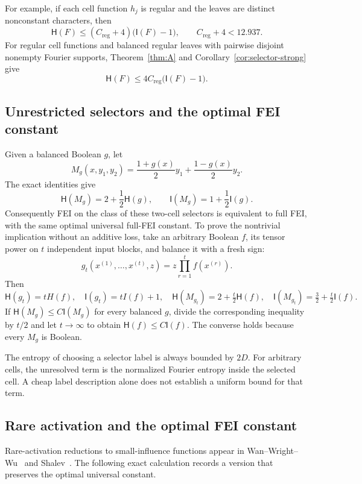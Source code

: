 \documentclass[11pt]{amsart}
\theoremstyle{definition}
\theoremstyle{remark}
\newcommand{\HH}{\mathsf H}
\newcommand{\I}{\mathsf I}
\newcommand{\Creg}{C_{\mathrm{reg}}}
\begin{document}
For example, if each cell function $h_j$ is regular and the leaves are
distinct nonconstant characters, then
\[
 \HH(F)\le(\Creg+4)\bigl(\I(F)-1\bigr),
 \qquad \Creg+4<12.937.
\]
For regular cell functions and balanced regular leaves with pairwise
disjoint nonempty Fourier supports, Theorem~\ref{thm:A} and
Corollary~\ref{cor:selector-strong} give
\[
 \HH(F)\le4\Creg\bigl(\I(F)-1\bigr).
\]

\subsection{Unrestricted selectors and the optimal FEI constant}

Given a balanced Boolean $g$, let
\[
 M_g(x,y_1,y_2)=\frac{1+g(x)}2y_1+\frac{1-g(x)}2y_2.
\]
The exact identities give
\[
 \HH(M_g)=2+\frac12\HH(g),\qquad \I(M_g)=1+\frac12\I(g).
\]
Consequently FEI on the class of these two-cell selectors is equivalent
to full FEI, with the same optimal universal full-FEI constant.
To prove the nontrivial implication without an additive loss, take an
arbitrary Boolean $f$, its tensor power on $t$ independent input blocks,
and balance it with a fresh sign:
\[
 g_t(x^{(1)},\ldots,x^{(t)},z)
   =z\prod_{r=1}^t f(x^{(r)}).
\]
Then
\[
 \HH(g_t)=tH(f),\quad \I(g_t)=tI(f)+1,
\quad \HH(M_{g_t})=2+\tfrac t2\HH(f),\quad
 \I(M_{g_t})=\tfrac32+\tfrac t2\I(f).
\]
If $\HH(M_g)\le C \I(M_g)$ for every balanced $g$, divide the corresponding
inequality by $t/2$ and let $t\to\infty$ to obtain $\HH(f)\le C \I(f)$.
The converse holds because every $M_g$ is Boolean.

The entropy of choosing a selector label is always bounded by $2D$.
For arbitrary cells, the unresolved term is the normalized Fourier
entropy inside the selected cell. A cheap label description alone does
not establish a uniform bound for that term.

\subsection{Rare activation and the optimal FEI constant}\label{sec:rare-equivalence}

Rare-activation reductions to small-influence functions appear in
Wan--Wright--Wu~\cite{WWW14} and Shalev~\cite{Shalev18}.
The following exact calculation records a version that preserves the
optimal universal constant.
\end{document}
